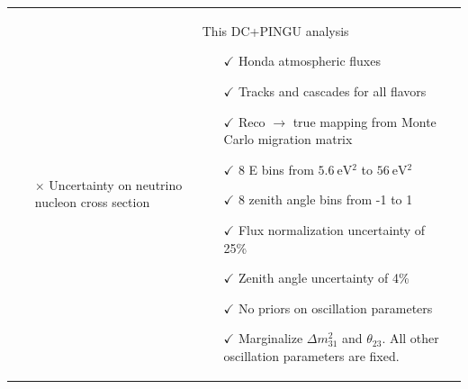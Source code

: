 \documentclass[draft=True]{revtex4-2}
\newcommand{\dm}{\Delta m^2_{31}}
\begin{document}
\begin{tabular}{p{55mm}p{55mm}p{55mm}}
\begin{itemize}
         \item[$\times$] Uncertainty on neutrino nucleon cross section 
      \end{itemize} &
    This DC+PINGU analysis
      \begin{itemize}
         \item[$\checkmark$] Honda atmospheric fluxes
         \item[$\checkmark$] Tracks and cascades for all flavors
         \vspace{1em} 
         \item[$\checkmark$] Reco $\to$ true mapping from Monte Carlo migration matrix
         \item[$\checkmark$] 8 E bins from $\SI{5.6}{\electronvolt^2}$ to $\SI{56}{\electronvolt^2}$
         \item[$\checkmark$] 8 zenith angle bins from -1 to 1
         \item[$\checkmark$] Flux normalization uncertainty of 25\%
         \item[$\checkmark$] Zenith angle uncertainty of 4\% 
         \item[$\checkmark$] No priors on oscillation parameters 
         \item[$\checkmark$] Marginalize $\dm$ and $\theta_{23}$. All other oscillation parameters are fixed.
      \end{itemize} 
\end{tabular}




\end{document}
